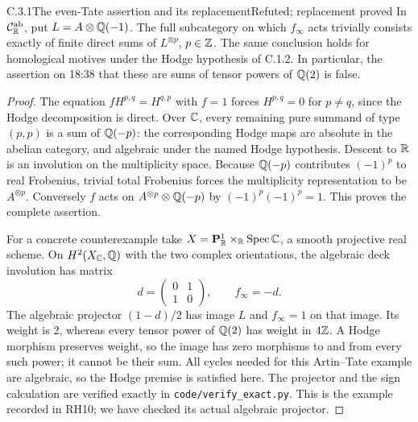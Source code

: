 \begin{result}{C.3.1}{The even-Tate assertion and its replacement}{Refuted; replacement proved}
In $\mathcal C_{\mathbb R}^{\mathrm{ab}}$, put $L=A\otimes\mathbb Q(-1)$. The full subcategory on which $f_\infty$ acts trivially consists exactly of finite direct sums of $L^{\otimes p}$, $p\in\mathbb Z$. The same conclusion holds for homological motives under the Hodge hypothesis of C.1.2. In particular, the assertion on 18:38 that these are sums of tensor powers of $\mathbb Q(2)$ is false.
\end{result}
\begin{proof}
The equation $fH^{p,q}=H^{q,p}$ with $f=1$ forces $H^{p,q}=0$ for $p\ne q$, since the Hodge decomposition is direct. Over $\mathbb C$, every remaining pure summand of type $(p,p)$ is a sum of $\mathbb Q(-p)$: the corresponding Hodge maps are absolute in the abelian category, and algebraic under the named Hodge hypothesis. Descent to $\mathbb R$ is an involution on the multiplicity space. Because $\mathbb Q(-p)$ contributes $(-1)^p$ to real Frobenius, trivial total Frobenius forces the multiplicity representation to be $A^{\otimes p}$. Conversely $f$ acts on $A^{\otimes p}\otimes\mathbb Q(-p)$ by $(-1)^p(-1)^p=1$. This proves the complete assertion.

For a concrete counterexample take $X=\mathbf P^1_\mathbb R\times_\mathbb R\operatorname{Spec}\mathbb C$, a smooth projective real scheme. On $H^2(X_\mathbb C,\mathbb Q)$ with the two complex orientations, the algebraic deck involution has matrix
\[
 d=\begin{pmatrix}0&1\\1&0\end{pmatrix},\qquad
 f_\infty=-d.
\]
The algebraic projector $(1-d)/2$ has image $L$ and $f_\infty=1$ on that image. Its weight is $2$, whereas every tensor power of $\mathbb Q(2)$ has weight in $4\mathbb Z$. A Hodge morphism preserves weight, so the image has zero morphisms to and from every such power; it cannot be their sum. All cycles needed for this Artin--Tate example are algebraic, so the Hodge premise is satisfied here. The projector and the sign calculation are verified exactly in \texttt{code/verify\_exact.py}. This is the example recorded in RH10; we have checked its actual algebraic projector.
\end{proof}

